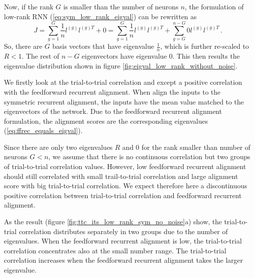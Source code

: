 \documentclass[11pt]{article}
\begin{document}
	Now, if the rank $G$ is smaller than the number of neurons $n$, the formulation of low-rank RNN (\ref{eq:sym_low_rank_eigval}) can be rewritten as 
		\begin{equation}
			J = \sum_{g =1}^{G} \frac{1}{n} l^{(g)} l^{(g)T} + 0 = \sum_{g =1}^{G} \frac{1}{n} l^{(g)} l^{(g)T} + \sum_{g =G}^{n-G} 0 l^{(g)} l^{(g)T} \, .
		\end{equation}
	So, there are $G$ basis vectors that have eigenvalue $\frac{1}{n}$, which is further re-scaled to $R < 1$. The rest of $n-G$ eigenvectors have eigenvalue $0$. This then results the eigenvalue distribution shown in figure \ref{fig:eigval_low_rank_without_noise}. 
	
	We firstly look at the trial-to-trial correlation and except a positive correlation with the feedforward recurrent alignment. When align the inputs to the symmetric recurrent alignment, the inputs have the mean value matched to the eigenvectors of the network. Due to the feedforward recurrent alignment formulation, the alignment scores are the corresponding eigenvalues (\ref{eq:ffrec_equals_eigval}). 
	
	Since there are only two eigenvalues $R$ and $0$ for the rank smaller than number of neurons $G < n$, we assume that there is no continuous correlation but two groups of trial-to-trial correlation values. However, low feedforward recurrent alignment should still correlated with small trail-to-trial correlation and large alignment score with big trial-to-trial correlation. We expect therefore here a discontinuous positive correlation between trial-to-trial correlation and feedforward recurrent alignment. 
	
	As the result (figure \ref{fig:ttc_its_low_rank_sym_no_noise}a) show, the trial-to-trial correlation distributes separately in two groups due to the number of eigenvalues. When the feedforward recurrent alignment is low, the trial-to-trial correlation concentrates also at the small number range. The trial-to-trial correlation increases when the feedforward recurrent alignment takes the larger eigenvalue. 
	
\end{document}
